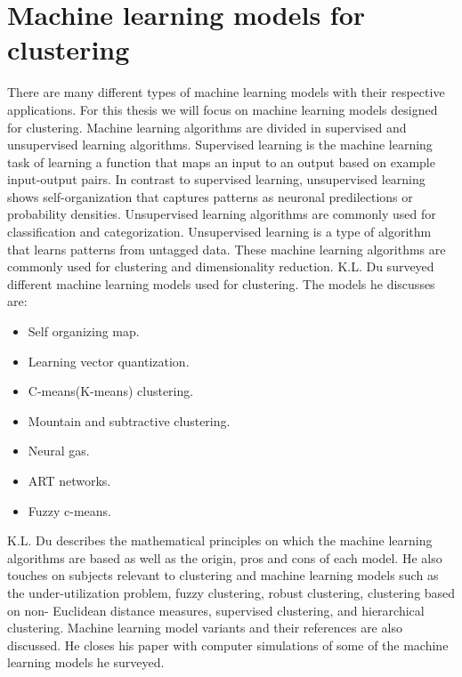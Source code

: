 \documentclass[../main]{subfiles}
\begin{document}
\section{Machine learning models for clustering}
\label{ch:neuralNetworkSurvey}
There are many different types of machine learning models with their respective applications.
For this thesis we will focus on machine learning models designed for clustering.
\newline
Machine learning algorithms are divided in supervised and unsupervised learning algorithms\cite{supervisedUnsupervised}.
Supervised learning is the machine learning task of learning a function that maps an input to an output based on example input-output pairs\cite{supervisedUnsupervised}.
In contrast to supervised learning, unsupervised learning shows self-organization that captures patterns as neuronal predilections or probability densities\cite{supervisedUnsupervised}.
Unsupervised learning algorithms are commonly used for classification and categorization\cite{supervisedUnsupervised}.
Unsupervised learning is a type of algorithm that learns patterns from untagged data\cite{supervisedUnsupervised}.
These machine learning algorithms are commonly used for clustering and dimensionality reduction\cite{supervisedUnsupervised}.
\newline
K.L. Du surveyed different machine learning models used for clustering\cite{Du2010Clustering:Approach}.
The models he discusses are:
\begin{itemize}
    \item Self organizing map.
    \item Learning vector quantization.
    \item C-means(K-means) clustering.
    \item Mountain and subtractive clustering.
    \item Neural gas.
    \item ART networks.
    \item Fuzzy c-means.
\end{itemize}
K.L. Du describes the mathematical principles on which the machine learning algorithms are based as well as the origin, pros and cons of each model.
\newline
He also touches on subjects relevant to clustering and machine learning models such as the under-utilization problem, fuzzy clustering, robust clustering, clustering based on non- Euclidean distance measures, supervised clustering, and hierarchical clustering.
Machine learning model variants and their references are also discussed.
\newline
He closes his paper with computer simulations of some of the machine learning models he surveyed.
\end{document}
